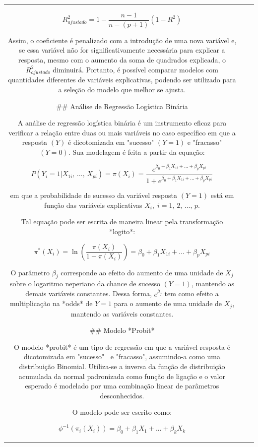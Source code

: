 \documentclass[
]{estat/estat}
\begin{document}
\begin{tabular}{c|cc}
$$
R^2_{ajustado} = 1 - \frac{n-1}{n-(p+1)} \left(1-R^2\right)
$$

Assim, o coeficiente é penalizado com a introdução de uma nova variável e, se essa variável não for significativamente necessária para explicar a resposta, mesmo com o aumento da soma de quadrados explicada, o $R^2_{ajustado}$ diminuirá. Portanto, é possível comparar modelos com quantidades diferentes de variáveis explicativas, podendo ser utilizado para a seleção do modelo que melhor se ajusta.

## Análise de Regressão Logística Binária

A análise de regressão logística binária é um instrumento eficaz para verificar a relação entre duas ou mais variáveis no caso específico em que a resposta $(Y)$ é dicotomizada em "sucesso" $(Y=1)$ e "fracasso" $(Y=0)$. Sua modelagem é feita a partir da equação:

$$
P(Y_i = 1|X_{1i}, \, \ldots , \, X_{pi}) = \pi(X_i)= \frac{e^{\beta_0 + \beta_1 X_{1i} + \ldots + \beta_p X_{pi}}}{1 + e^{\beta_0 + \beta_1 X_{1i} + \ldots + \beta_p X_{pi}}}
$$

em que a probabilidade de sucesso da variável resposta $(Y=1)$ está em função das variáveis explicativas $X_i,\; i=1,\, 2, \, \ldots , \,p$.

Tal equação pode ser escrita de maneira linear pela transformação *logito*:

$$
\pi^*(X_i)=\ln\left(\frac{\pi(X_i)}{1-\pi(X_i)}\right)=\beta_0+\beta_1X_{1i}+ \ldots +\beta_pX_{pi}
$$

O parâmetro $\beta_{j}$ corresponde ao efeito do aumento de uma unidade de $X_{j}$ sobre o logaritmo neperiano da chance de sucesso $(Y=1)$, mantendo as demais variáveis constantes. Dessa forma, $\displaystyle e^{\beta_j}$ tem como efeito a multiplicação na *odds* de $Y=1$ para o aumento de uma unidade de $X_{j}$, mantendo as variáveis constantes.

## Modelo *Probit*

O modelo *probit* é um tipo de regressão em que a variável resposta é dicotomizada em "sucesso" $\:$ e "fracasso", assumindo-a como uma distribuição Binomial. Utiliza-se a inversa da função de distribuição acumulada da normal padronizada como função de ligação e o valor esperado é modelado por uma combinação linear de parâmetros desconhecidos.

O modelo pode ser escrito como:

$$ \phi^{-1}(\pi_i(X_i))=\beta_0+\beta_1X_1+...+\beta_kX_k $$


\end{tabular}
\end{document}
